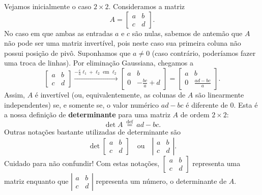 \documentclass[../livro.tex]{subfiles}  %
\begin{document}
Vejamos inicialmente o caso $2 \times 2$. Consideramos a matriz
\begin{equation}
A = \begin{bmatrix}
a & b \\
c & d
\end{bmatrix}.
\end{equation} No caso em que ambas as entradas $a$ e $c$ são nulas, sabemos de antemão que $A$ não pode ser uma matriz invertível, pois neste caso sua primeira coluna não possui posição de pivô. Suponhamos que $a \neq 0$ (caso contrário, poderíamos fazer uma troca de linhas). Por eliminação Gaussiana, chegamos a
\begin{equation}
\begin{bmatrix}
a & b \\
c & d
\end{bmatrix} \xrightarrow{- \frac{c}{a} \ell_1 + \ell_2 \text{ em } \ell_2}
\begin{bmatrix}
a & b \\
0 & - \frac{bc}{a} + d
\end{bmatrix} = 
\begin{bmatrix}
a & b \\
0 & \frac{ad - bc}{a}
\end{bmatrix}.
\end{equation} Assim, $A$ é invertível (ou, equivalentemente, as colunas de $A$ são linearmente independentes) se, e somente se, o valor numérico $ad - bc$ é diferente de $0$. Esta é a nossa definição de \textbf{determinante} para uma matriz $A$ de ordem $2 \times 2$:
\begin{equation}
\det A \ \stackrel{\text{def}}{=} \ ad - bc.
\end{equation} Outras notações bastante utilizadas de determinante são
\begin{equation}
\det \begin{bmatrix}
a & b \\
c & d
\end{bmatrix} \quad \text{ou} \quad
\left| \begin{matrix}
a & b \\
c & d
\end{matrix} \right|.
\end{equation} Cuidado para não confundir! Com estas notações, $\begin{bmatrix}
a & b \\
c & d
\end{bmatrix}$ representa uma matriz enquanto que $\left| \begin{matrix}
a & b \\
c & d
\end{matrix} \right|$ representa um número, o determinante de $A$. 
\end{document}
